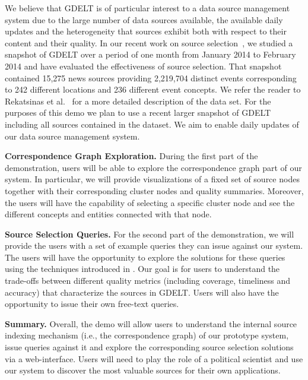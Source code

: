 \documentclass{sig-alternate}
\begin{document}
We believe that GDELT is of particular interest to a data source management system due to the large number of data sources available, the available daily updates and the heterogeneity that sources exhibit both with respect to their content and their quality. In our recent work on source selection~\cite{rekatsinas:2014}, we studied a snapshot of GDELT over a period of one month from January 2014 to February 2014 and have evaluated the effectiveness of source selection. That snapshot contained 15,275 news sources providing 2,219,704 distinct events corresponding to 242 different locations and 236 different event concepts. We refer the reader to Rekatsinas et al.~\cite{rekatsinas:2014} for a more detailed description of the data set. For the purposes of this demo we plan to use a recent larger snapshot of GDELT including all sources contained in the dataset. We aim to enable daily updates of our data source management system.

\vspace{3pt}\noindent\textbf{Correspondence Graph Exploration.} During the first part of the demonstration, users will be able to explore the correspondence graph part of our system. In particular, we will provide visualizations of a fixed set of source nodes together with their corresponding cluster nodes and quality summaries. Moreover, the users will have the capability of selecting a specific cluster node and see the different concepts and entities connected with that node.

\vspace{3pt}\noindent\textbf{Source Selection Queries.} For the second part of the demonstration, we will provide the users with a set of example queries they can issue against our system. The users will have the opportunity to explore the solutions for these queries using the techniques introduced in . Our goal is for users to understand the trade-offs between different quality metrics (including coverage, timeliness and accuracy) that characterize the sources in GDELT. Users will also have the opportunity to issue their own free-text queries.

\vspace{3pt}\noindent\textbf{Summary.} Overall, the demo will allow users to understand the internal source indexing mechanism (i.e., the correspondence graph) of our prototype system, issue queries against it and explore the corresponding source selection solutions via a web-interface. Users will need to play the role of a political scientist and use our system to discover the most valuable sources for their own applications.
 \balance
\end{document}
